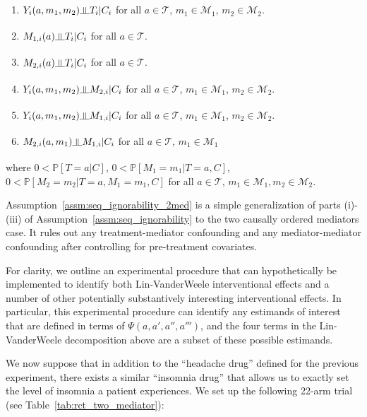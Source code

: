 \begin{assumption}\label{assm:seq_ignorability_2med} 
\indent
\begin{enumerate}[noitemsep,topsep=0pt,label=(\roman*)]
	\item $Y_{i}(a,m_{1},m_{2}) \indep T_{i} | C_{i}$ for all 
	$a \in \mathcal{T}$, $m_{1} \in \mathcal{M}_{1}$, $m_{2} \in \mathcal{M}_{2}$. 
	\item $M_{1,i}(a) \indep T_{i} | C_{i}$ for all $a \in \mathcal{T}$. 
	\item $M_{2,i}(a) \indep T_{i} | C_{i}$ for all $a \in \mathcal{T}$. 
	\item $Y_{i}(a,m_{1},m_{2}) \indep M_{2,i} | C_{i}$ 
	for all $a \in \mathcal{T}$, $m_{1} \in \mathcal{M}_{1}$, $m_{2} \in \mathcal{M}_{2}$. 
	\item $Y_{i}(a,m_{1},m_{2}) \indep M_{1,i} | C_{i}$ 
	for all $a \in \mathcal{T}$, $m_{1} \in \mathcal{M}_{1}$, $m_{2} \in \mathcal{M}_{2}$. 
	\item $M_{2,i}(a,m_{1}) \indep M_{1,i} | C_{i}$ 
	for all $a \in \mathcal{T}$, $m_{1} \in \mathcal{M}_{1}$
\end{enumerate}
where $0 < \mathbb{P}[T = a | C]$, $0 < \mathbb{P}[M_{1} = m_{1} | T = a, C]$,
$0 < \mathbb{P}[M_{2} = m_{2} | T = a, M_{1} = m_{1}, C]$
for all $a \in \mathcal{T}$, $m_{1} \in \mathcal{M}_{1}, m_{2} \in \mathcal{M}_{2}$. 
\end{assumption}

Assumption~\ref{assm:seq_ignorability_2med} is a simple generalization of parts (i)-(iii) of 
Assumption~\ref{assm:seq_ignorability} to the two causally ordered mediators case. It rules out
any treatment-mediator confounding and any mediator-mediator confounding after controlling for 
pre-treatment covariates. 

For clarity, we outline an experimental procedure that can hypothetically be implemented to identify
both Lin-VanderWeele interventional effects and a number of other potentially substantively interesting
interventional effects. In particular, this experimental procedure
can identify any estimands of interest that are defined in terms of $\Psi(a,a',a'',a''')$, and the 
four terms in the Lin-VanderWeele decomposition above are a subset of these possible estimands. 

We now suppose that in addition to the ``headache drug'' defined for the previous experiment, there 
exists a similar ``insomnia drug'' that allows us to exactly set the level of insomnia a patient
experiences. We set up the following 22-arm trial (see Table~\ref{tab:rct_two_mediator}):

